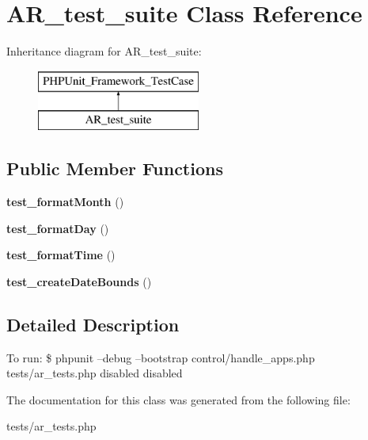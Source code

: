 \hypertarget{classAR__test__suite}{\section{A\-R\-\_\-test\-\_\-suite Class Reference}
\label{classAR__test__suite}
}
Inheritance diagram for A\-R\-\_\-test\-\_\-suite\-:\begin{figure}[H]
\begin{center}
\leavevmode
\includegraphics[height=2.000000cm]{classAR__test__suite}
\end{center}
\end{figure}
\subsection*{Public Member Functions}
\begin{DoxyCompactItemize}
\item 
\hypertarget{classAR__test__suite_aa35b707ad07fb6f68e1a5c3f542bd2d9}{{\bfseries test\-\_\-format\-Month} ()}\label{classAR__test__suite_aa35b707ad07fb6f68e1a5c3f542bd2d9}

\item 
\hypertarget{classAR__test__suite_a7767e5f2899f34d98a46841acad7ea0a}{{\bfseries test\-\_\-format\-Day} ()}\label{classAR__test__suite_a7767e5f2899f34d98a46841acad7ea0a}

\item 
\hypertarget{classAR__test__suite_ad086344fb4ee3169f8a146abc641daed}{{\bfseries test\-\_\-format\-Time} ()}\label{classAR__test__suite_ad086344fb4ee3169f8a146abc641daed}

\item 
\hypertarget{classAR__test__suite_a36f2302b55a526e44443f79430d3a71b}{{\bfseries test\-\_\-create\-Date\-Bounds} ()}\label{classAR__test__suite_a36f2302b55a526e44443f79430d3a71b}

\end{DoxyCompactItemize}


\subsection{Detailed Description}
To run\-: \$ phpunit --debug --bootstrap control/handle\-\_\-apps.\-php tests/ar\-\_\-tests.\-php  disabled  disabled 

The documentation for this class was generated from the following file\-:\begin{DoxyCompactItemize}
\item 
tests/ar\-\_\-tests.\-php\end{DoxyCompactItemize}
